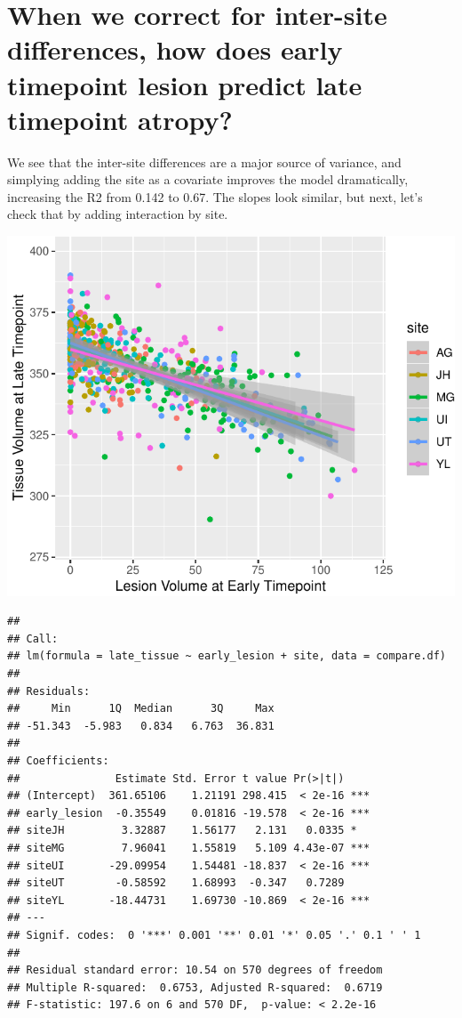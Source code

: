 \documentclass[
]{article}
\begin{document}
\hypertarget{when-we-correct-for-inter-site-differences-how-does-early-timepoint-lesion-predict-late-timepoint-atropy}{%
\section{When we correct for inter-site differences, how does early
timepoint lesion predict late timepoint
atropy?}\label{when-we-correct-for-inter-site-differences-how-does-early-timepoint-lesion-predict-late-timepoint-atropy}}

We see that the inter-site differences are a major source of variance,
and simplying adding the site as a covariate improves the model
dramatically, increasing the R2 from 0.142 to 0.67. The slopes look
similar, but next, let's check that by adding interaction by site.

\begin{center}\includegraphics{paper_files/figure-latex/plot_harm-1} \end{center}

\begin{verbatim}
## 
## Call:
## lm(formula = late_tissue ~ early_lesion + site, data = compare.df)
## 
## Residuals:
##     Min      1Q  Median      3Q     Max 
## -51.343  -5.983   0.834   6.763  36.831 
## 
## Coefficients:
##               Estimate Std. Error t value Pr(>|t|)    
## (Intercept)  361.65106    1.21191 298.415  < 2e-16 ***
## early_lesion  -0.35549    0.01816 -19.578  < 2e-16 ***
## siteJH         3.32887    1.56177   2.131   0.0335 *  
## siteMG         7.96041    1.55819   5.109 4.43e-07 ***
## siteUI       -29.09954    1.54481 -18.837  < 2e-16 ***
## siteUT        -0.58592    1.68993  -0.347   0.7289    
## siteYL       -18.44731    1.69730 -10.869  < 2e-16 ***
## ---
## Signif. codes:  0 '***' 0.001 '**' 0.01 '*' 0.05 '.' 0.1 ' ' 1
## 
## Residual standard error: 10.54 on 570 degrees of freedom
## Multiple R-squared:  0.6753, Adjusted R-squared:  0.6719 
## F-statistic: 197.6 on 6 and 570 DF,  p-value: < 2.2e-16
\end{verbatim}
\end{document}

